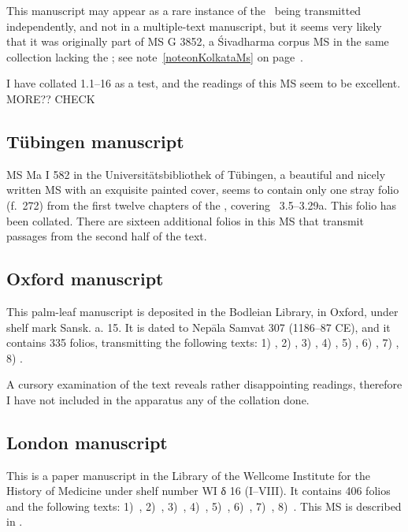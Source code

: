 This manuscript may appear as a rare instance of the \VSS\
being transmitted independently, and not in a multiple-text
manuscript, but it seems very likely that it was originally part of
MS G 3852, a Śivadharma corpus MS in the same collection 
lacking the \VSS; see note~\ref{noteonKolkataMs}
on page~\pageref{noteonKolkataMs}.

I have collated 1.1--16 as a test, and the readings of this MS
seem to be excellent. MORE?? CHECK



\medskip
\subsection{Tübingen manuscript}

MS Ma I 582 in the Universitätsbibliothek of
Tübingen, a beautiful and nicely written MS with
an exquisite painted cover,
seems to contain only one stray folio (f.~272)
from the first twelve chapters of the \VSS, 
covering \VSS\ 3.5--3.29a. This folio has been collated.
There are sixteen additional folios in this MS
that transmit passages from the second half of the text. 

\medskip
\subsection{Oxford manuscript}

This palm-leaf manuscript is deposited in the Bodleian Library, in Oxford, 
under shelf mark %
Sansk. a. 15. It is dated to Nepāla Samvat 307 (1186--87 CE),
and it contains 335 folios, transmitting the following texts: 
1) \SDhS, %
2) \SDhU,
3) \SDhSangr, %
4) \Ums, %
5) \SivaUp, %
6) \Uums, %
7) \Vss, %
8) \DharmP. %

A cursory examination of the text reveals rather disappointing 
readings, therefore I have not included  in the apparatus
any of the collation done.


\medskip
\subsection{London manuscript}

This is a paper manuscript in the
Library of the Wellcome Institute for the History of Medicine
under shelf number WI δ 16 (I--VIII). 
It contains 406 folios and the following texts: 
1)~\SDhS, 
2)~\SDhU,
3)~\SDhSangr, 
4)~\Ums,
5)~\SivaUp,
6)~\Uums,
7)~\Vss,
8)~\DharmP.
This MS is described in .

